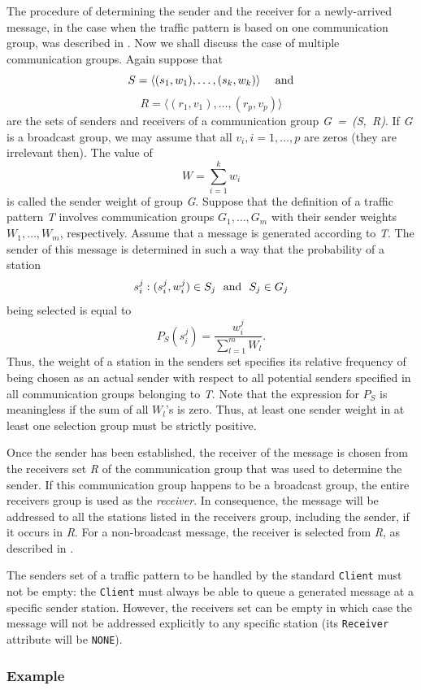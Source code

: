 The procedure of determining the sender and the receiver for a newly-arrived
message, in the case when the traffic pattern is based on one communication
group, was described in .
Now we shall discuss the case of multiple communication groups.
Again suppose that
\[
S = \langle (s_1, w_1), \ldots ,(s_k, w_k) \rangle~~~~{\rm and}
\]
\[
R = \langle (r_1, v_1) , \ldots ,(r_p, v_p) \rangle
\]
are the sets of senders
and receivers of a communication group {\em G~=~(S,~R)}.
If {\em G\/} is a broadcast group, we may assume that all
$v_i, i=1, \ldots , p$
are zeros (they are irrelevant then).
The value of
\[
W = \sum_{i=1}^k w_i
\]
is called the sender weight of group {\em G}.
Suppose that the definition of a traffic pattern {\em T\/} involves
communication groups
$G_1, \ldots , G_m$ with their
sender weights $W_1, \ldots , W_m$,
respectively.
Assume that a message is generated according to {\em T}.
The sender of this
message is determined in such a way that the probability of a
station
\[
s_i^j: (s_i^j, w_i^j) \in S_j ~~{\rm and}~~S_j \in G_j
\]
being selected is equal to
\[
P_S (s_i^j) = \frac{w_i^j}{\sum_{l=1}^m W_l}.
\]
Thus, the weight of a station in the senders set specifies its relative
frequency of being chosen as an actual sender with respect to all potential
senders specified in all communication groups belonging to {\em T}.
Note that the expression for
$P_S$
is meaningless if the sum of all $W_l$'s is zero.
Thus, at
least one sender weight in at least one selection group must be strictly
positive.

Once the sender has been established, the receiver of the message is chosen from
the receivers set {\em R\/} of the communication group that was used to determine
the sender.
If this communication group happens to be a broadcast group,
the entire receivers group is used as the {\em receiver}.
In consequence, the message will be addressed to all the stations
listed in the receivers group, including the sender, if it occurs in {\em R}.
For a non-broadcast message, the receiver is selected from {\em R}, as described in
.

The senders set of a traffic pattern to be handled by the standard {\tt Client}
must not be empty: the {\tt Client} must always be able to queue a generated
message at a specific sender station.
However, the receivers set can be empty in which case the message will not be
addressed explicitly to any specific station (its {\tt Receiver} attribute
will be {\tt NONE}).

\subsubsection*{Example}

